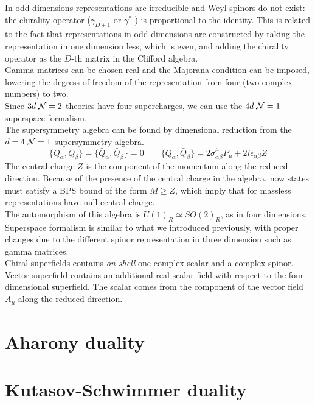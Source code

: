In odd dimensions representations are irreducible and Weyl spinors do not exist: the chirality operator ($\gamma_{D+1}$ or $\gamma^*$ ) is proportional to the identity.
This is related to the fact that representations in odd dimensions are constructed by taking the representation in one dimension less, which is even, and adding the chirality operator as the $D$-th matrix in the Clifford algebra.\\
Gamma matrices can be chosen real and the Majorana condition can be imposed, lowering the degress of freedom of the representation from four (two complex numbers) to two.\\
Since $3d \; \mathcal{N}=2$ theories have four supercharges, we can use the $4d \; \mathcal{N}=1$ superspace formalism. 
\\
The supersymmetry algebra can be found by dimensional reduction from  the $d=4 \; \mathcal{N}=1$ supersymmetry algebra. 
\begin{equation}
 \{ Q_{\alpha},Q_{\beta} \} =  \{ \bar{Q}_{\alpha},\bar{Q}_{\beta} \}= 0 \qquad \{ Q_{\alpha} , \bar{Q}_{\beta}   \} = 2 \sigma^{\mu}_{\alpha \beta} P_{\mu} + 2 i \epsilon_{\alpha \beta} Z
 \end{equation} 
The central charge $Z$ is the component of the momentum  along the reduced direction.
Because of the presence of the central charge in the algebra, now states must satisfy a BPS bound of the form $M \geq Z $, which imply that for massless representations have null central charge.
\\
The automorphism of this algebra is $U(1)_R \simeq SO(2)_R$, as in four dimensions.
\\
Superspace formalism is similar to what we introduced previously, with proper changes due to the different spinor representation in three dimension such as gamma matrices.
\\
Chiral superfields contains \emph{on-shell} one complex scalar and a complex spinor.
Vector superfield contains an additional real scalar field with respect to the four dimensional superfield.
The scalar comes from the component of the vector field $A_{\mu}$ along the reduced direction.  

















\section{Aharony duality}
\section{Kutasov-Schwimmer duality}
